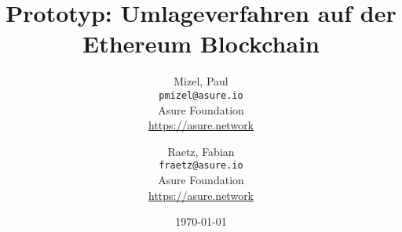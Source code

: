 
\title{Prototyp: Umlageverfahren auf der Ethereum Blockchain}
\author{
  Mizel, Paul\\
  \texttt{pmizel@asure.io}\\
  Asure Foundation \\ 
  {\url{https://asure.network}}\\
  \and
  Raetz, Fabian\\
  \texttt{fraetz@asure.io}\\
  Asure Foundation \\ 
  {\url{https://asure.network}}\\
}

\date{\today}
\maketitle

